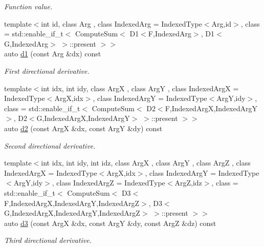 \begin{DoxyCompactItemize}
\begin{DoxyCompactList}\small\item\em Function value. \end{DoxyCompactList}\item 
{\footnotesize template$<$int id, class Arg , class Indexed\-Arg  = Indexed\-Type$<$\-Arg,id$>$, class  = std\-::enable\-\_\-if\-\_\-t$<$ Compute\-Sum$<$ D1$<$\-F,\-Indexed\-Arg$>$, D1$<$\-G,\-Indexed\-Arg$>$ $>$\-::present $>$$>$ }\\auto \hyperlink{structFunG_1_1MathematicalOperations_1_1Sum_a0327f21277ac4babad3a8f74ed99a3ed}{d1} (const Arg \&dx) const 
\begin{DoxyCompactList}\small\item\em First directional derivative. \end{DoxyCompactList}\item 
{\footnotesize template$<$int idx, int idy, class Arg\-X , class Arg\-Y , class Indexed\-Arg\-X  = Indexed\-Type$<$\-Arg\-X,idx$>$, class Indexed\-Arg\-Y  = Indexed\-Type$<$\-Arg\-Y,idy$>$, class  = std\-::enable\-\_\-if\-\_\-t$<$ Compute\-Sum$<$ D2$<$\-F,\-Indexed\-Arg\-X,\-Indexed\-Arg\-Y$>$, D2$<$\-G,\-Indexed\-Arg\-X,\-Indexed\-Arg\-Y$>$ $>$\-::present $>$$>$ }\\auto \hyperlink{structFunG_1_1MathematicalOperations_1_1Sum_a76a96e76fde4fe3165f14ecbd5e5a09c}{d2} (const Arg\-X \&dx, const Arg\-Y \&dy) const 
\begin{DoxyCompactList}\small\item\em Second directional derivative. \end{DoxyCompactList}\item 
{\footnotesize template$<$int idx, int idy, int idz, class Arg\-X , class Arg\-Y , class Arg\-Z , class Indexed\-Arg\-X  = Indexed\-Type$<$\-Arg\-X,idx$>$, class Indexed\-Arg\-Y  = Indexed\-Type$<$\-Arg\-Y,idy$>$, class Indexed\-Arg\-Z  = Indexed\-Type$<$\-Arg\-Z,idz$>$, class  = std\-::enable\-\_\-if\-\_\-t$<$ Compute\-Sum$<$ D3$<$\-F,\-Indexed\-Arg\-X,\-Indexed\-Arg\-Y,\-Indexed\-Arg\-Z$>$, D3$<$\-G,\-Indexed\-Arg\-X,\-Indexed\-Arg\-Y,\-Indexed\-Arg\-Z$>$ $>$\-::present $>$$>$ }\\auto \hyperlink{structFunG_1_1MathematicalOperations_1_1Sum_a9a23c2e0084436b29ce9d684aba78ebc}{d3} (const Arg\-X \&dx, const Arg\-Y \&dy, const Arg\-Z \&dz) const 
\begin{DoxyCompactList}\small\item\em Third directional derivative. \end{DoxyCompactList}\end{DoxyCompactItemize}


